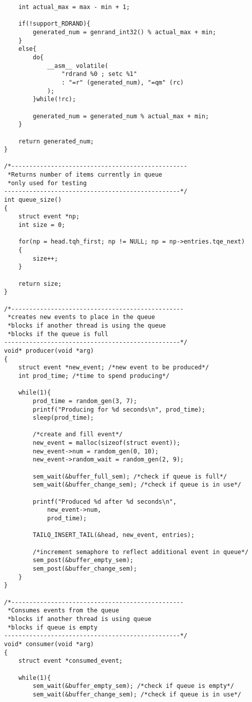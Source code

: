 \documentclass[10pt,onecolumn]{article}
\begin{document}
\begin{lstlisting}
	int actual_max = max - min + 1;

	if(!support_RDRAND){
		generated_num = genrand_int32() % actual_max + min;
	}
	else{
		do{
			__asm__ volatile(
				"rdrand %0 ; setc %1"
				: "=r" (generated_num), "=qm" (rc)
			);
		}while(!rc);

		generated_num = generated_num % actual_max + min;
	}

	return generated_num;
}

/*-------------------------------------------------
 *Returns number of items currently in queue
 *only used for testing
-------------------------------------------------*/
int queue_size()
{
	struct event *np;
	int size = 0;

	for(np = head.tqh_first; np != NULL; np = np->entries.tqe_next)
	{
		size++;
	}

	return size;
}

/*------------------------------------------------
 *creates new events to place in the queue
 *blocks if another thread is using the queue
 *blocks if the queue is full
-------------------------------------------------*/
void* producer(void *arg)
{
	struct event *new_event; /*new event to be produced*/
	int prod_time; /*time to spend producing*/

	while(1){
		prod_time = random_gen(3, 7);
		printf("Producing for %d seconds\n", prod_time);
		sleep(prod_time);

		/*create and fill event*/
		new_event = malloc(sizeof(struct event));
		new_event->num = random_gen(0, 10);
		new_event->random_wait = random_gen(2, 9);

		sem_wait(&buffer_full_sem); /*check if queue is full*/
		sem_wait(&buffer_change_sem); /*check if queue is in use*/

		printf("Produced %d after %d seconds\n",
			new_event->num,
			prod_time);

		TAILQ_INSERT_TAIL(&head, new_event, entries);

		/*increment semaphore to reflect additional event in queue*/
		sem_post(&buffer_empty_sem);
		sem_post(&buffer_change_sem);
	}
}

/*------------------------------------------------
 *Consumes events from the queue
 *blocks if another thread is using queue
 *blocks if queue is empty
-------------------------------------------------*/
void* consumer(void *arg)
{
	struct event *consumed_event;

	while(1){
		sem_wait(&buffer_empty_sem); /*check if queue is empty*/
		sem_wait(&buffer_change_sem); /*check if queue is in use*/


\end{lstlisting}
\end{document}
